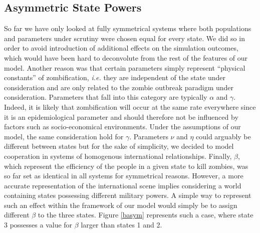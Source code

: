\documentclass[11pt]{article} %
\begin{document}
\subsection{Asymmetric State Powers}\indent
\label{sec:asym}

So far we have only looked at fully symmetrical systems where both populations and parameters under scrutiny were chosen equal for every state. We did so in order to avoid introduction of additional effects on the simulation outcomes, which would have been hard to deconvolute from the rest of the features of our model. Another reason was that certain parameters simply represent ``physical constants'' of zombification, \textit{i.e.} they are independent of the state under consideration and are only related to the zombie outbreak paradigm under consideration. Parameters that fall into this category are typically $\alpha$ and $\gamma$. Indeed, it is likely that zombification will occur at the same rate everywhere since it is an epidemiological parameter and should therefore not be influenced by factors such as socio-economical environments. Under the assumptions of our model, the same consideration hold for $\gamma$. Parameters $\nu$ and $\eta$ could arguably be different between states but for the sake of simplicity, we decided to model cooperation in systems of homogenous international relationships. Finally, $\beta$, which represent the efficiency of the people in a given state to kill zombies, was so far set as identical in all systems for symmetrical reasons. However, a more accurate representation of the international scene implies considering a world containing states possessing different military powers. A simple way to represent such an effect within the framework of our model would simply be to assign different $\beta$ to the three states. Figure \ref{basym} represents such a case, where state 3 possesses a value for $\beta$ larger than states 1 and 2. 
 
\end{document}

